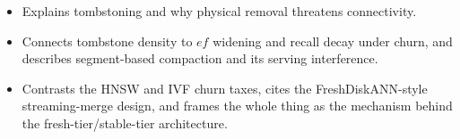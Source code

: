 \begin{interviewq}
\goodgreat
\begin{itemize}
    \item {} Explains tombstoning and why physical removal threatens connectivity.
    \item {} Connects tombstone density to $ef$ widening and recall decay under churn, and describes segment-based compaction and its serving interference.
    \item {} Contrasts the HNSW and IVF churn taxes, cites the FreshDiskANN-style streaming-merge design, and frames the whole thing as the mechanism behind the fresh-tier/stable-tier architecture.
\end{itemize}

\end{interviewq}

